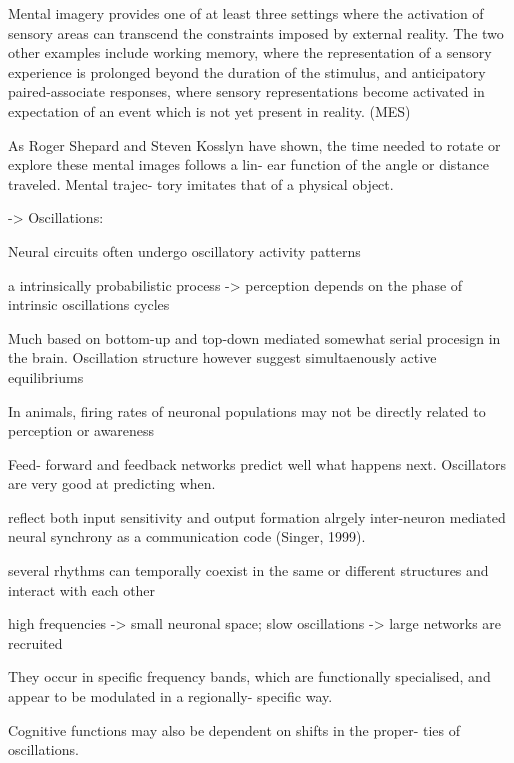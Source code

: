 \documentclass[authoryear,review,3p]{elsarticle}
\begin{document}
Mental imagery provides one of at least three settings where the activation of sensory areas can transcend the constraints imposed by external reality. The two other examples include working memory, where the representation of a sensory experience is prolonged beyond the duration of the stimulus, and anticipatory paired-associate responses, where sensory representations become activated in expectation of an event which is not yet present in reality. (MES)







As Roger Shepard and Steven Kosslyn have shown, the time needed to rotate or explore these mental images follows a lin- ear function of the angle or distance traveled. Mental trajec- tory imitates that of a physical object.












-> Oscillations:

Neural circuits often undergo oscillatory activity patterns

a intrinsically probabilistic process
-> perception depends on the phase of intrinsic oscillations cycles

Much based on bottom-up and top-down mediated somewhat serial
procesign in the brain. Oscillation structure however suggest simultaenously
active equilibriums


In animals, firing rates of neuronal populations may not be
directly related to perception or awareness

Feed- forward and feedback networks predict well what happens next. Oscillators are very good at predicting when.

reflect both input sensitivity and output formation
alrgely inter-neuron mediated
neural synchrony as a communication code (Singer, 1999).

several rhythms can temporally coexist in the same or different structures and interact with each other

high frequencies -> small neuronal space; slow oscillations -> large networks are recruited

They occur in specific frequency bands, which are functionally specialised, and appear to be modulated in a regionally- specific way.

Cognitive functions may also be dependent on shifts in the proper- ties of oscillations.
\end{document}
